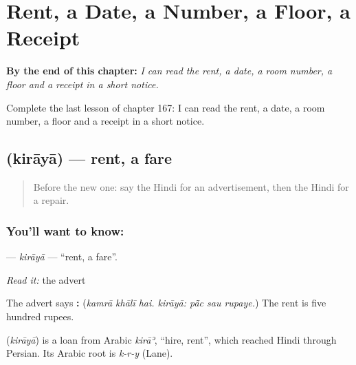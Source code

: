 
\chapter{Rent, a Date, a Number, a Floor, a Receipt}
\label{ch:hi-rent-a-date-a-number-a-floor-a-receipt}

\begin{chapteropening}
\textbf{By the end of this chapter:} \emph{I can read the rent, a date, a room number, a floor and a receipt in a short notice.}

Complete the last lesson of chapter 167: I can read the rent, a date, a room number, a floor and a receipt in a short notice.
\end{chapteropening}

\section[\texorpdfstring{\hi{किराया} (kirāyā)}{किराया (kirāyā)}]{ (kirāyā) — rent, a fare}

\label{lesson:HI-C167-kiraya}



\begin{quote}
Before the new one: say the Hindi for an advertisement, then the Hindi for a repair.
\end{quote}

\subsection*{You'll want to know: }
\textbf{} — \emph{kirāyā} — \textquotedblleft{}rent, a fare\textquotedblright{}.

\emph{Read it:} the advert

The advert says \textbf{   :   } (\emph{kamrā khālī hai. kirāyā: pā̃c sau rupaye.}) The rent is five hundred rupees.

\begin{cousinweb}
\textbf{} (\emph{kirāyā}) is a loan from Arabic \emph{kirāʾ}, \textquotedblleft{}hire, rent\textquotedblright{}, which reached Hindi through Persian. Its Arabic root is \emph{k-r-y} (Lane).
\end{cousinweb}

